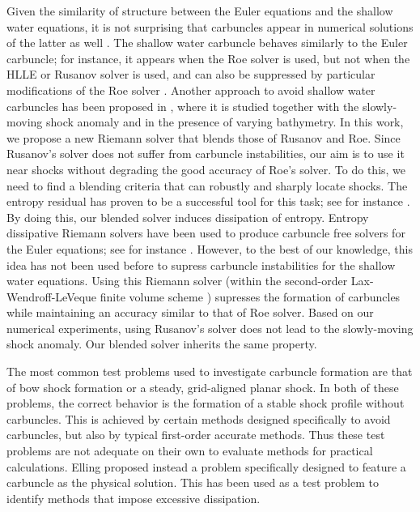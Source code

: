 \documentclass[preprint, 11pt]{article}
\begin{document}
Given the similarity of structure between the Euler equations and the shallow
water equations, it is not surprising that carbuncles appear in numerical
solutions of the latter as well \cite{kemm2014note}.
The shallow water carbuncle behaves similarly to the
Euler carbuncle; for instance, it appears when the Roe solver is used, but not when
the HLLE or Rusanov solver is used, and can also be suppressed by particular modifications
of the Roe solver \cite{kemm2014note,bader2014carbuncle}.  Another approach to avoid
shallow water carbuncles has been proposed in \cite{navas2019improved}, where it is
studied together with the slowly-moving shock anomaly and in the presence of varying bathymetry.
In this work, we propose a new Riemann solver that blends those of Rusanov and Roe.
{\color{red} Since Rusanov's solver does not suffer from carbuncle instabilities,
  our aim is to use it near shocks without degrading the good accuracy of Roe's solver. 
  To do this, we need to find a blending criteria that can robustly and sharply locate shocks.
  The entropy residual has proven to be a successful tool for this task; see for instance
  \cite{guermond2011entropy,guermond2018second,guermond2018well}.
  By doing this, our blended solver induces dissipation of entropy.
  Entropy dissipative Riemann solvers have been used to produce carbuncle free solvers for the Euler equations;
  see for instance \cite{ismail2009affordable,ismail2009proposed}.
  However, to the best of our knowledge, this idea has not been used before to supress carbuncle instabilities for the
  shallow water equations. 
}
Using this Riemann solver (within the second-order Lax-Wendroff-LeVeque 
finite volume scheme \cite{leveque1997wave, leveque2002finite}) supresses the formation of carbuncles 
while maintaining an accuracy similar to that of Roe solver.  
{\color{OliveGreen}
  Based on our numerical experiments, using Rusanov's solver does not lead to the 
  slowly-moving shock anomaly. Our blended solver inherits the same property.
}

The most common test problems used to investigate carbuncle formation are
that of bow shock formation or a steady, grid-aligned planar shock.
In both of these problems, the correct behavior is the formation of a stable
shock profile without carbuncles.  This is achieved by certain methods
designed specifically to avoid carbuncles, but also by typical first-order
accurate methods.  Thus these test problems are not adequate on their own to
evaluate methods for practical calculations.
Elling \cite{elling2009carbuncle} proposed instead a problem specifically
designed to feature a carbuncle as the physical solution.  This has
been used as a test problem to identify methods that impose excessive dissipation.
\end{document}
